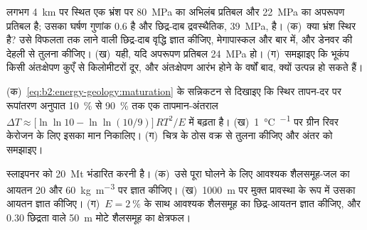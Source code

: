 \begin{exercise}[$\star\star\star$]\label{exo:b2:energy-geology:10}
लगभग \qty{4}{km} पर स्थित एक भ्रंश पर \qty{80}{MPa} का अभिलंब प्रतिबल और
\qty{22}{MPa} का अपरूपण प्रतिबल है; उसका घर्षण गुणांक 0.6 है और छिद्र-दाब द्रवस्थैतिक,
\qty{39}{MPa}, है। (क)~क्या भ्रंश स्थिर है? उसे विफलता तक लाने वाली छिद्र-दाब वृद्धि ज्ञात कीजिए,
मेगापास्कल और बार में, और डेनवर की देहली से तुलना कीजिए। (ख)~यही, यदि अपरूपण प्रतिबल
\qty{24}{MPa} हो। (ग)~समझाइए कि भूकंप किसी अंतःक्षेपण कुएँ से किलोमीटरों दूर, और अंतःक्षेपण आरंभ होने के
वर्षों बाद, क्यों उत्पन्न हो सकते हैं।
\end{exercise}

\begin{exercise}[$\star\star\star$]\label{exo:b2:energy-geology:11}
(क)~\eqref{eq:b2:energy-geology:maturation} के सन्निकटन से दिखाइए कि स्थिर तापन-दर पर रूपांतरण
अनुपात \qty{10}{\percent} से \qty{90}{\percent} तक एक तापमान-अंतराल
$\Delta T \approx \bigl[\ln\ln 10 - \ln\ln(10/9)\bigr]\,RT^2/E$ में बढ़ता है। (ख)~\qty{1}{\celsius\per\Myr} पर ग्रीन रिवर
केरोजन के लिए इसका मान निकालिए। (ग)~चित्र के ठोस वक्र से तुलना कीजिए और
अंतर को समझाइए।
\end{exercise}

\begin{exercise}[$\star\star\star$]\label{exo:b2:energy-geology:12}
स्लाइपनर को \qty{20}{Mt}  भंडारित करनी है। (क)~उसे पूरा घोलने के लिए आवश्यक शैलसमूह-जल का आयतन
20 और \qty{60}{kg.m^{-3}} पर ज्ञात कीजिए। (ख)~\qty{1000}{m} पर मुक्त प्रावस्था के रूप में उसका आयतन
ज्ञात कीजिए। (ग)~$E = \qty{2}{\percent}$ के साथ आवश्यक शैलसमूह का छिद्र-आयतन ज्ञात कीजिए, और
0.30 छिद्रता वाले \qty{50}{m} मोटे शैलसमूह का क्षेत्रफल।
\end{exercise}

